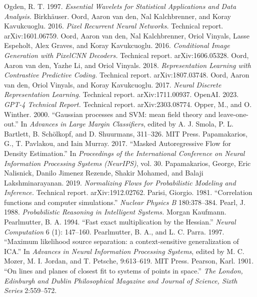  Ogden, R. T. 1997. \emph{Essential Wavelets for Statistical Applications and Data Analysis.} Birkh\"auser.
 Oord, Aaron van den, Nal Kalchbrenner, and Koray Kavukcuoglu. 2016. \emph{Pixel Recurrent Neural Networks.} Technical report. arXiv:1601.06759.
 Oord, Aaron van den, Nal Kalchbrenner, Oriol Vinyals, Lasse Espeholt, Alex Graves, and Koray Kavukcuoglu. 2016. \emph{Conditional Image Generation with PixelCNN Decoders.} Technical report. arXiv:1606.05328.
 Oord, Aaron van den, Yazhe Li, and Oriol Vinyals. 2018. \emph{Representation Learning with Contrastive Predictive Coding.} Technical report. arXiv:1807.03748.
 Oord, Aaron van den, Oriol Vinyals, and Koray Kavukcuoglu. 2017. \emph{Neural Discrete Representation Learning.} Technical report. arXiv:1711.00937.
 OpenAI. 2023. \emph{GPT-4 Technical Report.} Technical report. arXiv:2303.08774.
 Opper, M., and O. Winther. 2000. ``Gaussian processes and SVM: mean field theory and leave-one-out.'' In \emph{Advances in Large Margin Classifiers}, edited by A. J. Smola, P. L. Bartlett, B. Sch\"olkopf, and D. Shuurmans, 311--326. MIT Press.
 Papamakarios, G., T. Pavlakou, and Iain Murray. 2017. ``Masked Autoregressive Flow for Density Estimation.'' In \emph{Proceedings of the International Conference on Neural Information Processing Systems (NeurIPS)}, vol. 30.
 Papamakarios, George, Eric Nalisnick, Danilo Jimenez Rezende, Shakir Mohamed, and Balaji Lakshminarayanan. 2019. \emph{Normalizing Flows for Probabilistic Modeling and Inference.} Technical report. arXiv:1912.02762.
 Parisi, Giorgio. 1981. ``Correlation functions and computer simulations.'' \emph{Nuclear Physics B} 180:378--384.
 Pearl, J. 1988. \emph{Probabilistic Reasoning in Intelligent Systems.} Morgan Kaufmann.
 Pearlmutter, B. A. 1994. ``Fast exact multiplication by the Hessian.'' \emph{Neural Computation} 6 (1): 147--160.
 Pearlmutter, B. A., and L. C. Parra. 1997. ``Maximum likelihood source separation: a context-sensitive generalization of ICA.'' In \emph{Advances in Neural Information Processing Systems}, edited by M. C. Mozer, M. I. Jordan, and T. Petsche, 9:613--619. MIT Press.
 Pearson, Karl. 1901. ``On lines and planes of closest fit to systems of points in space.'' \emph{The London, Edinburgh and Dublin Philosophical Magazine and Journal of Science, Sixth Series} 2:559--572.
